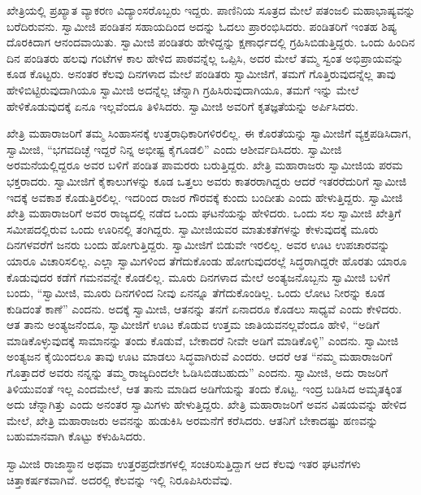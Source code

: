 \vskip 2pt

 ಖೇತ್ರಿಯಲ್ಲಿ ಪ್ರಖ್ಯಾತ ವ್ಯಾಕರಣ ವಿದ್ಯಾಂಸರೊಬ್ಬರು ಇದ್ದರು. ಪಾಣಿನಿಯ ಸೂತ್ರದ ಮೇಲೆ ಪತಂಜಲಿ ಮಹಾಭಾಷ್ಯವನ್ನು ಬರೆದಿರುವನು. ಸ್ವಾಮೀಜಿ ಪಂಡಿತನ ಸಹಾಯದಿಂದ ಅದನ್ನು ಓದಲು ಪ್ರಾರಂಭಿಸಿದರು. ಪಂಡಿತರಿಗೆ ಇಂತಹ ಶಿಷ್ಯ ದೊರಕಿದಾಗ ಆನಂದವಾಯಿತು. ಸ್ವಾಮೀಜಿ ಪಂಡಿತರು ಹೇಳಿದ್ದನ್ನು ಕ್ಷಣಾರ್ಧದಲ್ಲಿ ಗ್ರಹಿಸಿಬಿಡುತ್ತಿದ್ದರು. ಒಂದು ಹಿಂದಿನ ದಿನ ಪಂಡಿತರು ಹಲವು ಗಂಟೆಗಳ ಕಾಲ ಹೇಳಿದ ಪಾಠವನ್ನೆಲ್ಲ ಒಪ್ಪಿಸಿ, ಅದರ ಮೇಲೆ ತಮ್ಮ ಸ್ವಂತ ಅಭಿಪ್ರಾಯವನ್ನು ಕೂಡ ಕೊಟ್ಟರು. ಅನಂತರ ಕೆಲವು ದಿನಗಳಾದ ಮೇಲೆ ಪಂಡಿತರು ಸ್ವಾಮೀಜಿಗೆ, ತಮಗೆ ಗೊತ್ತಿರುವುದನ್ನೆಲ್ಲ ತಾವು ಹೇಳಿಬಿಟ್ಟಿರುವುದಾಗಿಯೂ ಸ್ವಾಮೀಜಿ ಅದನ್ನೆಲ್ಲ ಚೆನ್ನಾಗಿ ಗ್ರಹಿಸಿರುವುದಾಗಿಯೂ, ತಮಗೆ ಇನ್ನು ಮೇಲೆ ಹೇಳಿಕೊಡುವುದಕ್ಕೆ ಏನೂ ಇಲ್ಲವೆಂದೂ ತಿಳಿಸಿದರು. ಸ್ವಾಮೀಜಿ ಅವರಿಗೆ ಕೃತಜ್ಞತೆಯನ್ನು ಅರ್ಪಿಸಿದರು. 

 ಖೇತ್ರಿ ಮಹಾರಾಜರಿಗೆ ತಮ್ಮ ಸಿಂಹಾಸನಕ್ಕೆ ಉತ್ತರಾಧಿಕಾರಿಗಳಿರಲಿಲ್ಲ. ಈ ಕೊರತೆಯನ್ನು ಸ್ವಾಮೀಜಿಗೆ ವ್ಯಕ್ತಪಡಿಸಿದಾಗ, ಸ್ವಾಮೀಜಿ, “ಭಗವದಿಚ್ಛೆ ಇದ್ದರೆ ನಿನ್ನ ಅಭೀಷ್ಟ ಕೈಗೂಡಲಿ” ಎಂದು ಆಶೀರ್ವದಿಸಿದರು. ಸ್ವಾಮೀಜಿ ಅರಮನೆಯಲ್ಲಿದ್ದರೂ ಅವರ ಬಳಿಗೆ ಪಂಡಿತ ಪಾಮರರು ಬರುತ್ತಿದ್ದರು. ಖೇತ್ರಿ ಮಹಾರಾಜರು ಸ್ವಾಮೀಜಿಯ ಪರಮ ಭಕ್ತರಾದರು. ಸ್ವಾಮೀಜಿಗೆ ಕೈಕಾಲುಗಳನ್ನು ಕೂಡ ಒತ್ತಲು ಅವರು ಕಾತರರಾಗಿದ್ದರು ಆದರೆ ಇತರರೆದುರಿಗೆ ಸ್ವಾಮೀಜಿ ಇದಕ್ಕೆ ಅವಕಾಶ ಕೊಡುತ್ತಿರಲಿಲ್ಲ. ಇದರಿಂದ ರಾಜರ ಗೌರವಕ್ಕೆ ಕುಂದು ಬಂದೀತು ಎಂದು ಹೇಳುತ್ತಿದ್ದರು. ಸ್ವಾಮೀಜಿ ಖೇತ್ರಿ ಮಹಾರಾಜರಿಗೆ ಅವರ ರಾಜ್ಯದಲ್ಲಿ ನಡೆದ ಒಂದು ಘಟನೆಯನ್ನು ಹೇಳಿದರು. ಒಂದು ಸಲ ಸ್ವಾಮೀಜಿ ಖೇತ್ರಿಗೆ ಸಮೀಪದಲ್ಲಿರುವ ಒಂದು ಊರಿನಲ್ಲಿ ತಂಗಿದ್ದರು. ಸ್ವಾಮೀಜಿಯವರ ಮಾತುಕತೆಗಳನ್ನು ಕೇಳುವುದಕ್ಕೆ ಮೂರು ದಿನಗಳವರೆಗೆ ಜನರು ಬಂದು ಹೋಗುತ್ತಿದ್ದರು. ಸ್ವಾಮೀಜಿಗೆ ಬಿಡುವೇ ಇರಲಿಲ್ಲ. ಅವರ ಊಟ ಉಪಚಾರವನ್ನು ಯಾರೂ ವಿಚಾರಿಸಲಿಲ್ಲ. ಎಲ್ಲಾ ಸ್ವಾಮಿಗಳಿಂದ ತೆಗೆದುಕೊಂಡು ಹೋಗುವುದರಲ್ಲೆ ಸಿದ್ಧರಾಗಿದ್ದರೇ ಹೊರತು ಯಾರೂ ಕೊಡುವುದರ ಕಡೆಗೆ ಗಮನವನ್ನೇ ಕೊಡಲಿಲ್ಲ. ಮೂರು ದಿನಗಳಾದ ಮೇಲೆ ಅಂತ್ಯಜನೊಬ್ಬನು ಸ್ವಾಮೀಜಿ ಬಳಿಗೆ ಬಂದು, “ಸ್ವಾಮೀಜಿ, ಮೂರು ದಿನಗಳಿಂದ ನೀವು ಏನನ್ನೂ ತೆಗೆದುಕೊಂಡಿಲ್ಲ. ಒಂದು ಲೋಟ ನೀರನ್ನು ಕೂಡ ಕುಡಿದಂತೆ ಕಾಣೆ” ಎಂದನು. ಅದಕ್ಕೆ ಸ್ವಾಮೀಜಿ, ಆತನನ್ನು ತನಗೆ ಏನಾದರೂ ಕೊಡಲು ಸಾಧ್ಯವೆ ಎಂದು ಕೇಳಿದರು. ಆತ ತಾನು ಅಂತ್ಯಜನೆಂದೂ, ಸ್ವಾಮೀಜಿಗೆ ಊಟ ಕೊಡುವ ಉತ್ತಮ ಜಾತಿಯವನಲ್ಲವೆಂದೂ ಹೇಳಿ, “ಅಡಿಗೆ ಮಾಡಿಕೊಳ್ಳುವುದಕ್ಕೆ ಸಾಮಾನನ್ನು ತಂದು ಕೊಡುವೆ, ಬೇಕಾದರೆ ನೀವೇ ಅಡಿಗೆ ಮಾಡಿಕೊಳ್ಳಿ” ಎಂದನು. ಸ್ವಾಮೀಜಿ ಅಂತ್ಯಜನ ಕೈಯಿಂದಲೂ ತಾವು ಊಟ ಮಾಡಲು ಸಿದ್ಧವಾಗಿರುವೆ ಎಂದರು. ಆದರೆ ಆತ “ನಮ್ಮ ಮಹಾರಾಜರಿಗೆ ಗೊತ್ತಾದರೆ ಅವರು ನನ್ನನ್ನು ತಮ್ಮ ರಾಜ್ಯದಿಂದಲೇ ಓಡಿಸಿಬಿಡಬಹುದು” ಎಂದನು. ಸ್ವಾಮೀಜಿ, ಅದು ರಾಜರಿಗೆ ತಿಳಿಯುವಂತೆ ಇಲ್ಲ ಎಂದಮೇಲೆ, ಆತ ತಾನು ಮಾಡಿದ ಅಡಿಗೆಯನ್ನು ತಂದು ಕೊಟ್ಟ. ಇಂದ್ರ ಬಡಿಸಿದ ಅಮೃತಕ್ಕಿಂತ ಅದು ಚೆನ್ನಾಗಿತ್ತು ಎಂದು ಅನಂತರ ಸ್ವಾಮಿಗಳು ಹೇಳುತ್ತಿದ್ದರು. ಖೇತ್ರಿ ಮಹಾರಾಜರಿಗೆ ಅವನ ವಿಷಯವನ್ನು ಹೇಳಿದ ಮೇಲೆ, ಖೇತ್ರಿ ಮಹಾರಾಜರು ಅವನನ್ನು ಹುಡುಕಿಸಿ ಅರಮನೆಗೆ ಕರೆಸಿದರು. ಆತನಿಗೆ ಬೇಕಾದಷ್ಟು ಹಣವನ್ನು ಬಹುಮಾನವಾಗಿ ಕೊಟ್ಟು ಕಳುಹಿಸಿದರು. 

 ಸ್ವಾಮೀಜಿ ರಾಜಾಸ್ಥಾನ ಅಥವಾ ಉತ್ತರಪ್ರದೇಶಗಳಲ್ಲಿ ಸಂಚರಿಸುತ್ತಿದ್ದಾಗ ಆದ ಕೆಲವು ಇತರ ಘಟನೆಗಳು ಚಿತ್ತಾಕರ್ಷಕವಾಗಿವೆ. ಅದರಲ್ಲಿ ಕೆಲವನ್ನು ಇಲ್ಲಿ ನಿರೂಪಿಸಿರುವೆವು. 

